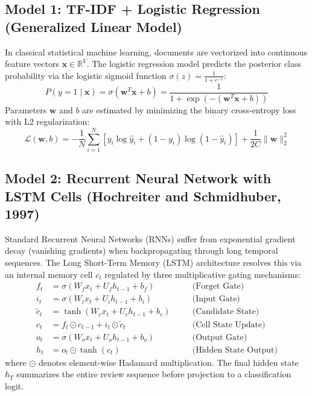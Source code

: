 \documentclass[12pt,a4paper]{report}
\begin{document}
\subsection{Model 1: TF-IDF + Logistic Regression (Generalized Linear Model)}
In classical statistical machine learning, documents are vectorized into continuous feature vectors $\mathbf{x} \in \mathbb{R}^{V}$. The logistic regression model predicts the posterior class probability via the logistic sigmoid function $\sigma(z) = \frac{1}{1 + e^{-z}}$:
\begin{equation}
    P(y = 1 \mid \mathbf{x}) = \sigma(\mathbf{w}^T \mathbf{x} + b) = \frac{1}{1 + \exp(-(\mathbf{w}^T \mathbf{x} + b))}
\end{equation}
Parameters $\mathbf{w}$ and $b$ are estimated by minimizing the binary cross-entropy loss with L2 regularization:
\begin{equation}
    \mathcal{L}(\mathbf{w}, b) = -\frac{1}{N} \sum_{i=1}^{N} \left[ y_i \log \hat{y}_i + (1 - y_i) \log(1 - \hat{y}_i) \right] + \frac{1}{2C} \|\mathbf{w}\|_2^2
\end{equation}

\subsection{Model 2: Recurrent Neural Network with LSTM Cells (Hochreiter and Schmidhuber, 1997)}
Standard Recurrent Neural Networks (RNNs) suffer from exponential gradient decay (vanishing gradients) when backpropagating through long temporal sequences. The Long Short-Term Memory (LSTM) architecture resolves this via an internal memory cell $c_t$ regulated by three multiplicative gating mechanisms:
\begin{align}
    f_t &= \sigma(W_f x_t + U_f h_{t-1} + b_f) \quad &&\text{(Forget Gate)} \\
    i_t &= \sigma(W_i x_t + U_i h_{t-1} + b_i) \quad &&\text{(Input Gate)} \\
    \tilde{c}_t &= \tanh(W_c x_t + U_c h_{t-1} + b_c) \quad &&\text{(Candidate State)} \\
    c_t &= f_t \odot c_{t-1} + i_t \odot \tilde{c}_t \quad &&\text{(Cell State Update)} \\
    o_t &= \sigma(W_o x_t + U_o h_{t-1} + b_o) \quad &&\text{(Output Gate)} \\
    h_t &= o_t \odot \tanh(c_t) \quad &&\text{(Hidden State Output)}
\end{align}
where $\odot$ denotes element-wise Hadamard multiplication. The final hidden state $h_T$ summarizes the entire review sequence before projection to a classification logit.
\end{document}
